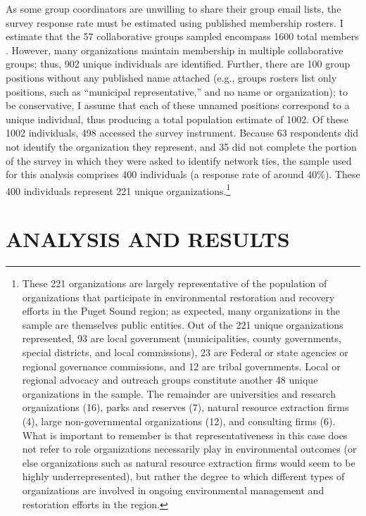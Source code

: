 \documentclass[12pt,a4paper,titlepage]{article}
\begin{document}
As some group coordinators are unwilling to share their group email lists, the survey response rate must be estimated using published membership rosters. I estimate that the 57 collaborative groups sampled encompass 1600 total members \parencite[see also][]{scott2015-a}. However, many organizations maintain membership in multiple collaborative groups; thus, 902 unique individuals are identified. Further, there are 100 group positions without any published name attached (e.g., groups rosters list only positions, such as “municipal representative,'' and no name or organization); to be conservative, I assume that each of these unnamed positions correspond to a unique individual, thus producing a total population estimate of 1002. Of these 1002 individuals, 498 accessed the survey instrument. Because 63 respondents did not identify the organization they represent, and 35 did not complete the portion of the survey in which they were asked to identify network ties, the sample used for this analysis comprises 400 individuals (a response rate of around 40\%). These 400 individuals represent 221 unique organizations.\footnote{These 221 organizations are largely representative of the population of organizations that participate in environmental restoration and recovery efforts in the Puget Sound region; as expected, many organizations in the sample are themselves public entities. Out of the 221 unique organizations represented, 93 are local government (municipalities, county governments, special districts, and local commissions), 23 are Federal or state agencies or regional governance commissions, and 12 are tribal governments. Local or regional advocacy and outreach groups constitute another 48 unique organizations in the sample. The remainder are universities and research organizations (16), parks and reserves (7), natural resource extraction firms (4), large non-governmental organizations (12), and consulting firms (6). What is important to remember is that representativeness in this case does not refer to role organizations necessarily play in environmental outcomes (or else organizations such as natural resource extraction firms would seem to be highly underrepresented), but rather the degree to which different types of organizations are involved in ongoing environmental management and restoration efforts in the region.}


\section{\bf\MakeUppercase{Analysis and Results}}
\end{document}
